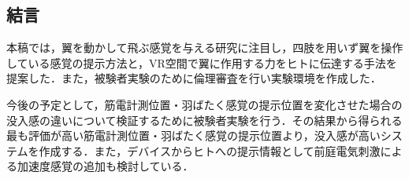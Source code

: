 \begin{small}



\section{結言}
  本稿では，翼を動かして飛ぶ感覚を与える研究に注目し，四肢を用いず翼を操作している感覚の提示方法と，VR空間で翼に作用する力をヒトに伝達する手法を提案した．また，被験者実験のために倫理審査を行い実験環境を作成した．

  今後の予定として，筋電計測位置・羽ばたく感覚の提示位置を変化させた場合の没入感の違いについて検証するために被験者実験を行う．その結果から得られる最も評価が高い筋電計測位置・羽ばたく感覚の提示位置より，没入感が高いシステムを作成する．また，デバイスからヒトへの提示情報として前庭電気刺激による加速度感覚\cite{青山一真2014前庭電気刺激における逆方向不感電流を用いた加速度感覚の増強}の追加も検討している．


{
\small
 \setlength{\kanjiskip}{0.0zw plus.01zw} %
 \setlength{\baselineskip}{9pt}        %
 \setlength{\itemsep}{0.2pt}             %
 \setlength{\lineskip}{0pt}              %


}



\end{small}

